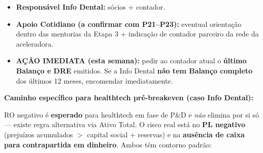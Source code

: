 \documentclass[11pt, a4paper]{article}
\begin{document}
\begin{itemize}[label=\textcolor{primaryColor}{$\blacktriangleright$}, leftmargin=1.6em]
    \item \textbf{Responsável Info Dental:} sócios + contador.
    \item \textbf{Apoio Cotidiano (a confirmar com P21--P23):} eventual orientação dentro das mentorias da Etapa 3 + indicação de contador parceiro da rede da aceleradora.
    \item \textcolor{accentColor}{\textbf{AÇÃO IMEDIATA (esta semana):}} pedir ao contador atual o \textbf{último Balanço e DRE} emitidos. Se a Info Dental \textbf{não tem Balanço completo} dos últimos 12 meses, encomendar imediatamente.
\end{itemize}

\vspace{4pt}
\textbf{\textcolor{primaryColor}{Caminho específico para healthtech pré-breakeven (caso Info Dental):}}

\vspace{2pt}
RO negativo é \textbf{esperado} para healthtech em fase de P\&D e \emph{não} elimina por si só --- existe regra alternativa via Ativo Total. O risco real está no \textbf{PL negativo} (prejuízos acumulados $>$ capital social $+$ reservas) e na \textbf{ausência de caixa para contrapartida em dinheiro}. Ambos têm contorno padrão:
\end{document}
